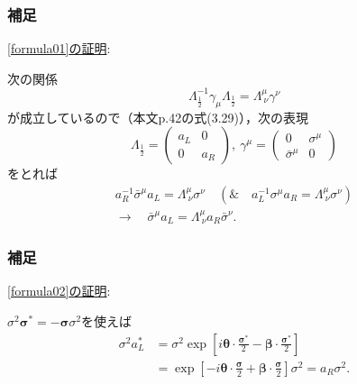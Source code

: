 \documentclass[pdflatex,unicode,ja=standard,12pt]{beamer}
\begin{document}
\begin{frame}[noframenumbering]

  \frametitle{補足 \subsecname}
  \thispagestyle{empty}

  \uline{\eqref{formula01}の証明}:

  \vspace{10pt}  

  次の関係
  \begin{equation}
    \Lambda_{\frac{1}{2}}^{-1}
    \gamma_{\mu}
    \Lambda_{\frac{1}{2}}
    =
    \Lambda^{\mu}_{\ \nu}\gamma^{\nu}
  \end{equation}
  が成立しているので（本文p.42の式(3.29)），次の表現
  \begin{equation}
    \Lambda_{\frac{1}{2}}
    =
    \begin{pmatrix}
      a_L & 0 \\
      0 & a_R
    \end{pmatrix}
    ,\ 
    \gamma^{\mu}
    =
    \begin{pmatrix}
      0 & \sigma^{\mu} \\
      \bar{\sigma}^{\mu} & 0
    \end{pmatrix}
  \end{equation}
  をとれば
  \begin{gather}
    a_{R}^{-1}\bar{\sigma}^{\mu}a_{L}
    =
    \Lambda^{\mu}_{\ \nu}\sigma^{\nu}
    \quad
    (
      \&
      \quad
      a_{L}^{-1}\sigma^{\mu}a_R
      =
      \Lambda^{\mu}_{\ \nu}\sigma^{\nu}
    )
    \nonumber
    \\
    \rightarrow\quad
    \bar{\sigma}^{\mu}a_{L}
    =
    \Lambda^{\mu}_{\ \nu}a_{R}\bar{\sigma}^{\nu}
    .
  \end{gather}

\end{frame}

\begin{frame}[noframenumbering]

  \frametitle{補足 \subsecname}
  \thispagestyle{empty}

  \uline{\eqref{formula02}の証明}:

  \vspace{10pt}

  $\sigma^2\bm{\sigma}^{*}=-\bm{\sigma}\sigma^2$を使えば
  \begin{align}
    \sigma^2 a_{L}^{*}
    &=
    \sigma^2\exp\left[  
      i\bm{\theta}\cdot\frac{\bm{\sigma}^{*}}{2}
      -
      \bm{\beta}\cdot\frac{\bm{\sigma}^{*}}{2}
    \right]
    \nonumber
    \\
    &=
    \exp\left[  
      -
      i\bm{\theta}\cdot\frac{\bm{\sigma}}{2}
      +
      \bm{\beta}\cdot\frac{\bm{\sigma}}{2}
    \right]
    \sigma^2
    =
    a_R \sigma^2
    .
  \end{align}

\end{frame}
\end{document}
